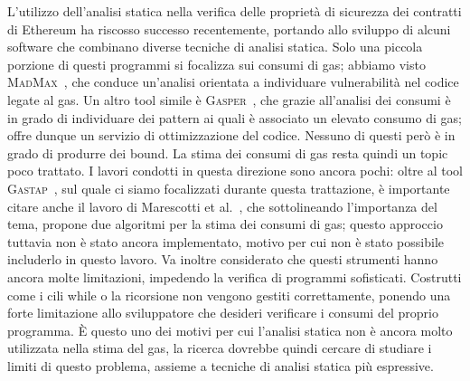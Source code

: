 L'utilizzo dell'analisi statica nella verifica delle proprietà di sicurezza dei contratti di Ethereum ha riscosso successo recentemente, portando allo sviluppo di alcuni software che combinano diverse tecniche di analisi statica. Solo una piccola porzione di questi programmi si focalizza sui consumi di gas; abbiamo visto \textsc{MadMax}~\cite{grech2018madmax}, che conduce un'analisi orientata a individuare vulnerabilità nel codice legate al gas. Un altro tool simile è \textsc{Gasper}~\cite{chen2017under}, che grazie all'analisi dei consumi è in grado di individuare dei pattern ai quali è associato un elevato consumo di gas; offre dunque un servizio di ottimizzazione del codice. Nessuno di questi però è in grado di produrre dei bound.\newline
\indent La stima dei consumi di gas resta quindi un topic poco trattato. I lavori condotti in questa direzione sono ancora pochi: oltre al tool \textsc{Gastap}~\cite{DBLP:journals/corr/abs-1811-10403}, sul quale ci siamo focalizzati durante questa trattazione, è importante citare anche il lavoro di Marescotti et al.~\cite{marescotti2018computing}, che sottolineando l'importanza del tema, propone due algoritmi per la stima dei consumi di gas; questo approccio tuttavia non è stato ancora implementato, motivo per cui non è stato possibile includerlo in questo lavoro.\newline
\indent Va inoltre considerato che questi strumenti hanno ancora molte limitazioni, impedendo la verifica di programmi sofisticati. Costrutti come i cili while o la ricorsione non vengono gestiti correttamente, ponendo una forte limitazione allo sviluppatore che desideri verificare i consumi del proprio programma. \`E questo uno dei motivi per cui l'analisi statica non è ancora molto utilizzata nella stima del gas, la ricerca dovrebbe quindi cercare di studiare i limiti di questo problema, assieme a tecniche di analisi statica più espressive.\newline
